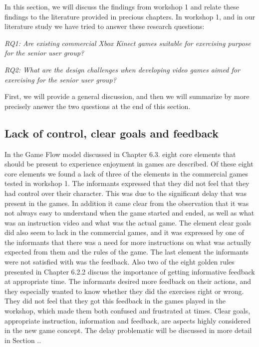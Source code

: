 In this section, we will discuss the findings from workshop 1 and relate these findings to the literature provided in precious chapters. In workshop 1, and in our literature study we have tried to answer these research questions: 

\emph{RQ1: Are existing commercial Xbox Kinect games suitable for exercising purpose for the senior user group?}

\emph{RQ2: What are the design challenges when developing video games aimed for exercising for the senior user group?}

First, we will provide a general discussion, and then we will summarize by more precisely answer the two questions at the end of this section. 

\subsection{Lack of control, clear goals and feedback}
In the Game Flow model \cite{sweetser} discussed in Chapter 6.3. eight core elements that should be present to experience enjoyment in games are described. Of these eight core elements we found a lack of three of the elements in the commercial games tested in workshop 1. The informants expressed that they did not feel that they had control over their character. This was due to the significant delay that was present in the games. In addition it came clear from the observation that it was not always easy to understand when the game started and ended, as well as what was an instruction video and what was the actual game. The element clear goals did also seem to lack in the commercial games, and it was expressed by one of the informants that there was a need for more instructions on what was actually expected from them and the rules of the game. The last element the informants were not satisfied with was the feedback. Also two of the eight golden rules presented in Chapter 6.2.2 discuss the importance of getting informative feedback at appropriate time. The informants desired more feedback on their actions, and they especially wanted to know whether they did the exercises right or wrong. They did not feel that they got this feedback in the games played in the workshop, which made them both confused and frustrated at times. Clear goals, appropriate instruction, information and feedback, are aspects highly considered in the new game concept. The delay problematic will be discussed in more detail in Section .. 
 
